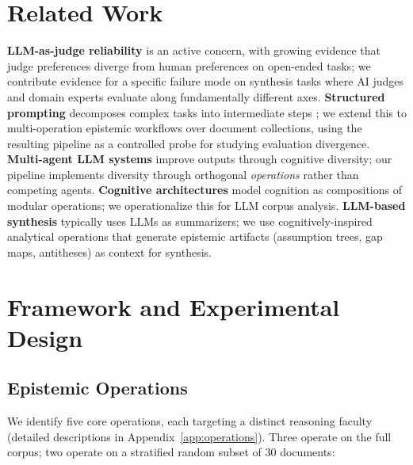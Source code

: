 \documentclass{article}
\begin{document}
\section{Related Work}
\label{sec:related}

\textbf{LLM-as-judge reliability} \citep{zheng2023judging,shankar2024validates,bavaresco2024llms} is an active concern, with growing evidence that judge preferences diverge from human preferences on open-ended tasks; we contribute evidence for a specific failure mode on synthesis tasks where AI judges and domain experts evaluate along fundamentally different axes. \textbf{Structured prompting} decomposes complex tasks into intermediate steps \citep{wei2022chain,zhou2023leasttomost,khot2023decomposed,yao2023tree}; we extend this to multi-operation epistemic workflows over document collections, using the resulting pipeline as a controlled probe for studying evaluation divergence. \textbf{Multi-agent LLM systems} \citep{du2024improving,liang2023encouraging,wu2023autogen,hong2024metagpt,zhang2024chain} improve outputs through cognitive diversity; our pipeline implements diversity through orthogonal \textit{operations} rather than competing agents. \textbf{Cognitive architectures} \citep{anderson2004integrated,laird2012soar,sumers2024cognitive,binz2023turning} model cognition as compositions of modular operations; we operationalize this for LLM corpus analysis. \textbf{LLM-based synthesis} \citep{wang2024autosurvey,lu2024aiscientist,giglou2025llms4synthesis,si2024can} typically uses LLMs as summarizers; we use cognitively-inspired analytical operations that generate epistemic artifacts (assumption trees, gap maps, antitheses) as context for synthesis.

\section{Framework and Experimental Design}
\label{sec:framework}

\subsection{Epistemic Operations}

We identify five core operations, each targeting a distinct reasoning faculty (detailed descriptions in Appendix~\ref{app:operations}). Three operate on the full corpus; two operate on a stratified random subset of 30 documents:
\end{document}

